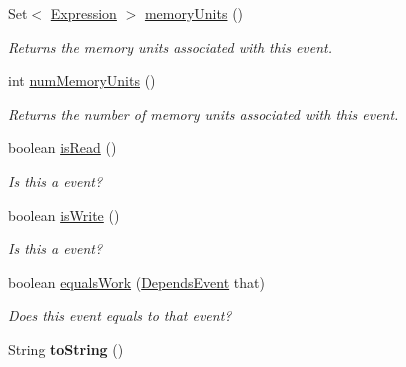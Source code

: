 \begin{DoxyCompactItemize}
\item 
Set$<$ \hyperlink{interfaceedu_1_1udel_1_1cis_1_1vsl_1_1civl_1_1model_1_1IF_1_1expression_1_1Expression}{Expression} $>$ \hyperlink{classedu_1_1udel_1_1cis_1_1vsl_1_1civl_1_1model_1_1common_1_1contract_1_1CommonReadOrWriteEvent_a4e09d245a8c123ace8573b21914531e3}{memory\+Units} ()
\begin{DoxyCompactList}\small\item\em Returns the memory units associated with this event. \end{DoxyCompactList}\item 
int \hyperlink{classedu_1_1udel_1_1cis_1_1vsl_1_1civl_1_1model_1_1common_1_1contract_1_1CommonReadOrWriteEvent_a0848afd154c491dfe830dfdd4484b3ba}{num\+Memory\+Units} ()
\begin{DoxyCompactList}\small\item\em Returns the number of memory units associated with this event. \end{DoxyCompactList}\item 
boolean \hyperlink{classedu_1_1udel_1_1cis_1_1vsl_1_1civl_1_1model_1_1common_1_1contract_1_1CommonReadOrWriteEvent_a56c286b1cdcc335b006b7b5d2c293cdd}{is\+Read} ()
\begin{DoxyCompactList}\small\item\em Is this a {\ttfamily } event? \end{DoxyCompactList}\item 
boolean \hyperlink{classedu_1_1udel_1_1cis_1_1vsl_1_1civl_1_1model_1_1common_1_1contract_1_1CommonReadOrWriteEvent_ab5dc6cf0e672b5dc50939b442758903b}{is\+Write} ()
\begin{DoxyCompactList}\small\item\em Is this a {\ttfamily } event? \end{DoxyCompactList}\item 
boolean \hyperlink{classedu_1_1udel_1_1cis_1_1vsl_1_1civl_1_1model_1_1common_1_1contract_1_1CommonReadOrWriteEvent_a1d5f52ca016f0086cd95fb2daf2b10d3}{equals\+Work} (\hyperlink{interfaceedu_1_1udel_1_1cis_1_1vsl_1_1civl_1_1model_1_1IF_1_1contract_1_1DependsEvent}{Depends\+Event} that)
\begin{DoxyCompactList}\small\item\em Does this event equals to that event? \end{DoxyCompactList}\item 
\hypertarget{classedu_1_1udel_1_1cis_1_1vsl_1_1civl_1_1model_1_1common_1_1contract_1_1CommonReadOrWriteEvent_a8e7e06f92f8c6766c5218342fdf39366}{}String {\bfseries to\+String} ()\label{classedu_1_1udel_1_1cis_1_1vsl_1_1civl_1_1model_1_1common_1_1contract_1_1CommonReadOrWriteEvent_a8e7e06f92f8c6766c5218342fdf39366}

\end{DoxyCompactItemize}



